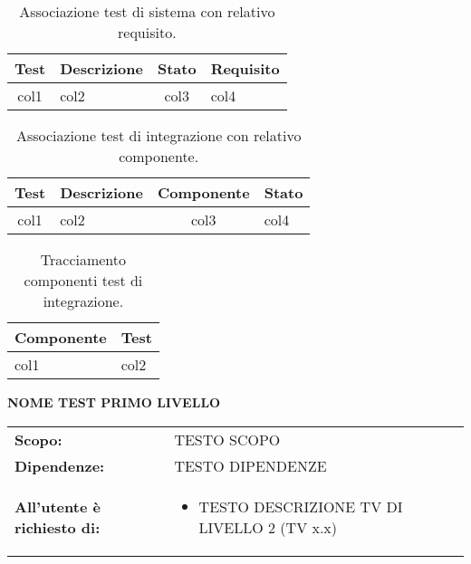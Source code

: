 \pagebreak


	
	\begin{table}[h]
		\begin{tabularx}{\textwidth}{ | c | P{3cm} | c | X | }
 			\hline \textbf{Test} & \textbf{Descrizione} & \textbf{Stato} & \textbf{Requisito} \\ %
 				\hline col1 & col2 & col3 & col4 \\ %
 			\hline %
		\end{tabularx}
		\caption{Associazione test di sistema con relativo requisito.}
	\end{table}
	
	
	

	\begin{table}[h]
		\begin{tabularx}{\textwidth}{ | c | P{3cm} | c | X | }
 			\hline \textbf{Test} & \textbf{Descrizione} & \textbf{Componente} & \textbf{Stato} \\ %
 				\hline col1 & col2 & col3 & col4 \\ %
 			\hline %
		\end{tabularx}
		\caption{Associazione test di integrazione con relativo componente.}
	\end{table}

	\begin{table}[h]
		\begin{tabularx}{\textwidth}{ | X | X | }
 			\hline \textbf{Componente} & \textbf{Test}  \\ %
 				\hline col1 & col2 \\ %
 			\hline %
		\end{tabularx}
		\caption{Tracciamento componenti test di integrazione.}
	\end{table}




\textbf{NOME TEST PRIMO LIVELLO} %
\begin{center}
      \bgroup
      \def\arraystretch{1.3}
	\begin{longtable}{ p{2.3cm} p{10cm} }
		\textbf{Scopo:} & TESTO SCOPO \\ %
		\textbf{Dipendenze:} & TESTO DIPENDENZE \\ %
		\textbf{All'utente è richiesto di:} &
			\begin{itemize} %
				\item TESTO DESCRIZIONE TV DI LIVELLO 2  (TV x.x) %
			\end{itemize}
	\end{longtable}
      \egroup
\end{center}  



